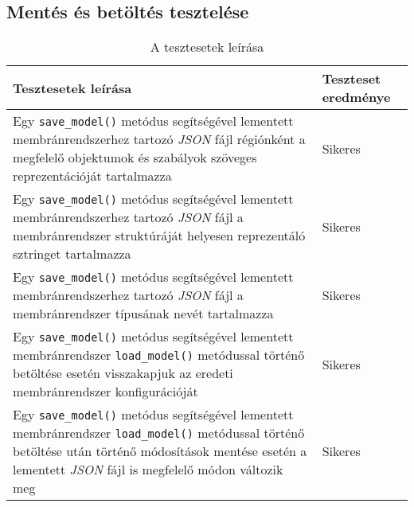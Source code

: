 \subsection{Mentés és betöltés tesztelése}
\begin{table}[H]
	\centering
	\begin{tabular}{ | m{} | m{} | }
		\hline
		\textbf{Tesztesetek leírása} & \textbf{Teszteset eredménye} \\
		\hline \hline
		Egy \verb|save_model()| metódus segítségével lementett membránrendszerhez tartozó \textit{JSON} fájl régiónként a megfelelő objektumok és szabályok szöveges reprezentációját tartalmazza & Sikeres \\
		\hline
		Egy \verb|save_model()| metódus segítségével lementett membránrendszerhez tartozó \textit{JSON} fájl a membránrendszer struktúráját helyesen reprezentáló sztringet tartalmazza  & Sikeres \\
		\hline
		Egy \verb|save_model()| metódus segítségével lementett membránrendszerhez tartozó \textit{JSON} fájl a membránrendszer típusának nevét tartalmazza & Sikeres \\
		\hline
			Egy \verb|save_model()| metódus segítségével lementett membránrendszer \verb|load_model()| metódussal történő betöltése esetén visszakapjuk az eredeti membránrendszer konfigurációját & Sikeres \\
		\hline
		Egy \verb|save_model()| metódus segítségével lementett membránrendszer \verb|load_model()| metódussal történő betöltése után történő módosítások mentése esetén a lementett \textit{JSON} fájl is megfelelő módon változik meg & Sikeres \\
		\hline
	\end{tabular}
	\caption{A tesztesetek leírása}
	\label{tab:test_cases_save_and_load}
\end{table}


